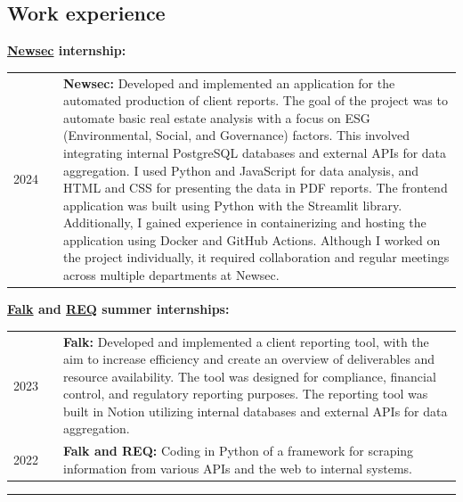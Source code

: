 \documentclass[10pt]{article}
\newlength{\cw}
\newlength{\cwl}
\begin{document}
\subsection*{Work experience}
 
\textbf{\href{https://www.newsec.no/}{Newsec} internship:}

\begin{tabular}{p{\cw} @{:}l p{\cwl}}
  2024 & & \textbf{Newsec:} Developed and implemented an application for the automated production of client reports.
  The goal of the project was to automate basic real estate analysis with a focus on ESG (Environmental, Social, and Governance) factors.
  This involved integrating internal PostgreSQL databases and external APIs for data aggregation.
  I used Python and JavaScript for data analysis, and HTML and CSS for presenting the data in PDF reports.
  The frontend application was built using Python with the Streamlit library.
  Additionally, I gained experience in containerizing and hosting the application using Docker and GitHub Actions.
  Although I worked on the project individually, it required collaboration and regular meetings across multiple departments at Newsec.
  \\
\end{tabular}

\textbf{\href{https://www.falkglobal.no/}{Falk} and \href{https://req.no/}{REQ} summer internships:}

\begin{tabular}{p{\cw} @{:}l p{\cwl}}
  2023 & & \textbf{Falk:} Developed and implemented a client reporting tool, with the aim to increase efficiency and create an overview of deliverables and resource availability.
  The tool was designed for compliance, financial control, and regulatory reporting purposes. The reporting tool was built in Notion utilizing internal databases and external APIs for data aggregation.\\
  2022 & & \textbf{Falk and REQ:} Coding in Python of a framework for scraping information from various APIs and the web to internal systems.
\end{tabular}

\vspace{0.1cm}
\hrule
\vspace{0.1cm}
\end{document}
